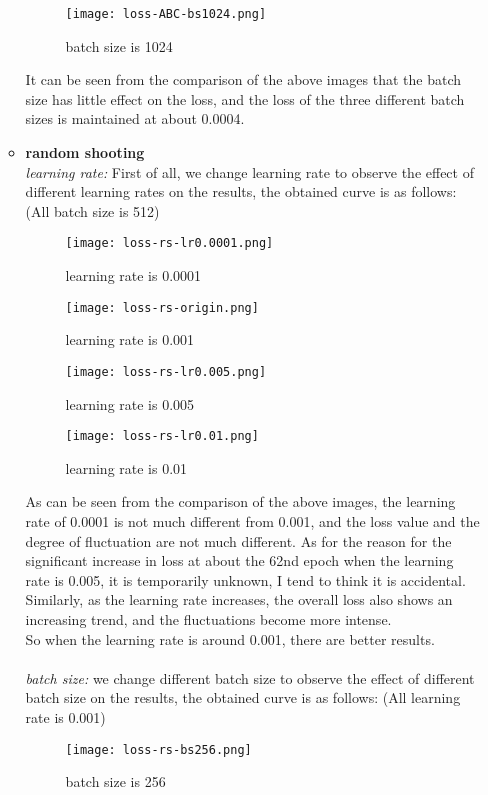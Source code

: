 \documentclass[12pt]{article}
\begin{document}
\begin{enumerate}
\begin{itemize}
    \begin{figure}[H]
      \centering
      \texttt{[image: loss-ABC-bs1024.png]}
      \caption{batch size is 1024}
    \end{figure}
    It can be seen from the comparison of the above images that the batch size has little effect on the loss, and the loss of the three different batch sizes is maintained at about 0.0004.\\
    
    \newpage
    \item \textbf{random shooting}\\
    \textit{learning rate:} First of all, we change learning rate to observe the effect of different learning rates on the results, the obtained curve is as follows: (All batch size is 512)
    \begin{figure}[H]
      \centering
      \texttt{[image: loss-rs-lr0.0001.png]}
      \caption{learning rate is 0.0001}
    \end{figure}
    
    \begin{figure}[H]
      \centering
      \texttt{[image: loss-rs-origin.png]}
      \caption{learning rate is 0.001}
    \end{figure}

    \begin{figure}[H]
      \centering
      \texttt{[image: loss-rs-lr0.005.png]}
      \caption{learning rate is 0.005}
    \end{figure}

    \begin{figure}[H]
      \centering
      \texttt{[image: loss-rs-lr0.01.png]}
      \caption{learning rate is 0.01}
    \end{figure}
    As can be seen from the comparison of the above images, the learning rate of 0.0001 is not much different from 0.001, and the loss value and the degree of fluctuation are not much different.
    As for the reason for the significant increase in loss at about the 62nd epoch when the learning rate is 0.005, it is temporarily unknown, I tend to think it is accidental.
    Similarly, as the learning rate increases, the overall loss also shows an increasing trend, and the fluctuations become more intense.\\
    So when the learning rate is around 0.001, there are better results.\\
    ~\\
    \textit{batch size:} we change different batch size to observe the effect of different batch size on the results, the obtained curve is as follows: (All learning rate is 0.001)
    \begin{figure}[H]
      \centering
      \texttt{[image: loss-rs-bs256.png]}
      \caption{batch size is 256}
    \end{figure}
    

\end{itemize}
\end{enumerate}
\end{document}
